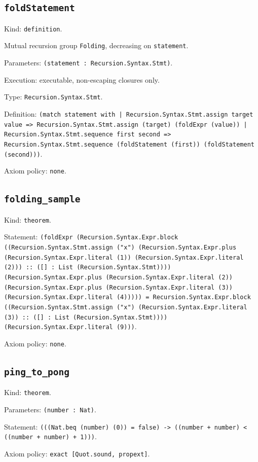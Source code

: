 \documentclass[11pt]{article}
\begin{document}
\subsection*{\texttt{foldStatement}}
\noindent Kind: \texttt{definition}.\par
\noindent Mutual recursion group \texttt{Folding}, decreasing on \texttt{statement}.\par
\noindent Parameters: \texttt{(statement : Recursion.Syntax.Stmt)}.\par
\noindent Execution: executable, non-escaping closures only.\par
\noindent Type: \texttt{Recursion.Syntax.Stmt}.\par
\noindent Definition: \texttt{(match statement with | Recursion.Syntax.Stmt.assign target value => Recursion.Syntax.Stmt.assign (target) (foldExpr (value)) | Recursion.Syntax.Stmt.sequence first second => Recursion.Syntax.Stmt.sequence (foldStatement (first)) (foldStatement (second)))}.\par
\noindent Axiom policy: \texttt{none}.\par
\subsection*{\texttt{folding\_sample}}
\noindent Kind: \texttt{theorem}.\par
\noindent Statement: \texttt{(foldExpr (Recursion.Syntax.Expr.block ((Recursion.Syntax.Stmt.assign ("x") (Recursion.Syntax.Expr.plus (Recursion.Syntax.Expr.literal (1)) (Recursion.Syntax.Expr.literal (2))) :: ([] : List (Recursion.Syntax.Stmt)))) (Recursion.Syntax.Expr.plus (Recursion.Syntax.Expr.literal (2)) (Recursion.Syntax.Expr.plus (Recursion.Syntax.Expr.literal (3)) (Recursion.Syntax.Expr.literal (4))))) = Recursion.Syntax.Expr.block ((Recursion.Syntax.Stmt.assign ("x") (Recursion.Syntax.Expr.literal (3)) :: ([] : List (Recursion.Syntax.Stmt)))) (Recursion.Syntax.Expr.literal (9)))}.\par
\noindent Axiom policy: \texttt{none}.\par
\subsection*{\texttt{ping\_to\_pong}}
\noindent Kind: \texttt{theorem}.\par
\noindent Parameters: \texttt{(number : Nat)}.\par
\noindent Statement: \texttt{(((Nat.beq (number) (0)) = false) -> ((number + number) < ((number + number) + 1)))}.\par
\noindent Axiom policy: \texttt{exact [Quot.sound, propext]}.\par
\end{document}

